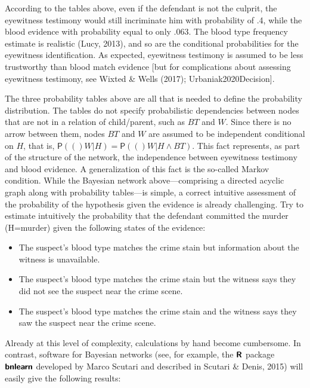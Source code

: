 \documentclass[11pt,dvipsnames,enabledeprecatedfontcommands]{scrartcl}
\newcommand{\pr}[1]{\mathsf{P}(#1)}
\begin{document}
\noindent According to the tables above, even if the defendant is not
the culprit, the eyewitness testimony would still incriminate him with
probability of .4, while the blood evidence with probability equal to
only .063. The blood type frequency estimate is realistic (Lucy, 2013),
and so are the conditional probabilities for the eyewitness
identification. As expected, eyewitness testimony is assumed to be less
trustworthy than blood match evidence {[}but for complications about
assessing eyewitness testimony, see Wixted \& Wells (2017);
Urbaniak2020Decision{]}.

The three probability tables above are all that is needed to define the
probability distribution. The tables do not specify probabilistic
dependencies between nodes that are not in a relation of child/parent,
such as \(BT\) and \(W\). Since there is no arrow between them, nodes
\(BT\) and \(W\) are assumed to be independent conditional on \(H\),
that is, \(\pr(W \vert H)=\pr(W \vert H \wedge BT)\). This fact
represents, as part of the structure of the network, the independence
between eyewitness testimony and blood evidence. A generalization of
this fact is the so-called Markov condition. While the Bayesian network
above---comprising a directed acyclic graph along with probability
tables---is simple, a correct intuitive assessment of the probability of
the hypothesis given the evidence is already challenging. Try to
estimate intuitively the probability that the defendant committed the
murder (H=murder) given the following states of the evidence:

\begin{itemize} 
\item The suspect's blood type matches the crime stain but  information about the witness is unavailable.
\item The suspect's blood type matches the crime stain but the witness says they did not see the suspect near the crime scene.
\item The suspect's blood type matches the crime stain and the witness says they saw the suspect near the crime scene.
\end{itemize}

\noindent Already at this level of complexity, calculations by hand
become cumbersome. In contrast, software for Bayesian networks (see, for
example, the \(\textbf{\textsf{R}}\) package
\(\textbf{\textsf{bnlearn}}\) developed by Marco Scutari and described
in Scutari \& Denis, 2015) will easily give the following results:
\end{document}
